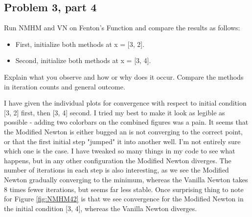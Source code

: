 \subsection{Problem 3, part 4}
Run NMHM and VN on Fenton's Function and compare the results as follows:
\begin{itemize}[a.]
    \item First, initialize both methods at x = [3, 2].
    \item Second, initialize both methods at x = [3, 4].
\end{itemize}
Explain what you observe and how or why does it occur. Compare the methods in iteration counts and general outcome.
\partbreak
\begin{solution}

    I have given the individual plots for convergence with respect to initial condition [3, 2] first, then [3, 4] second. I tried my best to make it look as legible as possible - adding two colorbars on the combined figures was a pain. It seems that the Modified Newton is either bugged an is not converging to the correct point, or that the first initial step "jumped" it into another well. I'm not entirely sure which one is the case. I have tweaked so many things in my code to see what happens, but in any other configuration the Modified Newton diverges. The number of iterations in each step is also interesting, as we see the Modified Newton gradually converging to the minimum, whereas the Vanilla Newton takes 8 times fewer iterations, but seems far less stable. Once surprising thing to note for Figure \ref{fig:NMHM42} is that we see convergence for the Modified Newton in the initial condition [3, 4], whereas the Vanilla Newton diverges.   
\end{solution}

